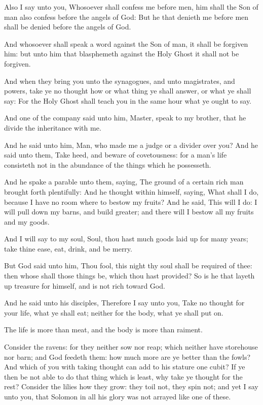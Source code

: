 \verse Also I say unto you, Whosoever shall confess me before men, him shall the Son of man also confess before the angels of God: \verse But he that denieth me before men shall be denied before the angels of God.

\verse And whosoever shall speak a word against the Son of man, it shall be forgiven him: but unto him that blasphemeth against the Holy Ghost it shall not be forgiven.

\verse And when they bring you unto the synagogues, and unto magistrates, and powers, take ye no thought how or what thing ye shall answer, or what ye shall say: \verse For the Holy Ghost shall teach you in the same hour what ye ought to say.

\verse And one of the company said unto him, Master, speak to my brother, that he divide the inheritance with me.

\verse And he said unto him, Man, who made me a judge or a divider over you?  \verse And he said unto them, Take heed, and beware of covetousness: for a man's life consisteth not in the abundance of the things which he possesseth.

\verse And he spake a parable unto them, saying, The ground of a certain rich man brought forth plentifully: \verse And he thought within himself, saying, What shall I do, because I have no room where to bestow my fruits?  \verse And he said, This will I do: I will pull down my barns, and build greater; and there will I bestow all my fruits and my goods.

\verse And I will say to my soul, Soul, thou hast much goods laid up for many years; take thine ease, eat, drink, and be merry.

\verse But God said unto him, Thou fool, this night thy soul shall be required of thee: then whose shall those things be, which thou hast provided?  \verse So is he that layeth up treasure for himself, and is not rich toward God.

\verse And he said unto his disciples, Therefore I say unto you, Take no thought for your life, what ye shall eat; neither for the body, what ye shall put on.

\verse The life is more than meat, and the body is more than raiment.

\verse Consider the ravens: for they neither sow nor reap; which neither have storehouse nor barn; and God feedeth them: how much more are ye better than the fowls?  \verse And which of you with taking thought can add to his stature one cubit?  \verse If ye then be not able to do that thing which is least, why take ye thought for the rest?  \verse Consider the lilies how they grow: they toil not, they spin not; and yet I say unto you, that Solomon in all his glory was not arrayed like one of these.

